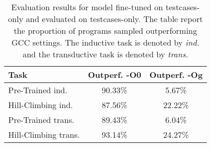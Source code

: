 \documentclass{article}
\begin{document}


\begin{table}[t]
\caption{Evaluation results for model fine-tuned on testcases-only and evaluated on testcases-only. The table report the proportion of programs sampled outperforming GCC settings. The inductive task is denoted by \textit{ind.} and the transductive task is denoted by \textit{trans.}}
\label{tab:random_generation_results}
\vskip 0.15in
\begin{center}
\begin{small}
\begin{sc}
\begin{tabular}{lcc}
\toprule
Task & Outperf. -O0 & Outperf. -Og \\
\midrule
Pre-Trained ind.    & 90.33\% & 5.67\% \\
Hill-Climbing ind.  & 87.56\% & 22.22\% \\
Pre-Trained trans.   & 89.43\% & 6.04\% \\
Hill-Climbing trans.  & 93.14\% & 24.27\% \\
\bottomrule
\end{tabular}
\end{sc}
\end{small}
\end{center}
\vskip -0.1in
\end{table}
\end{document}
